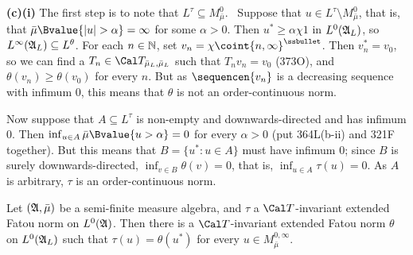 {\medskip

{\bf (c)(i)} The first step is to note that
$L^{\tau}\subseteq M^0_{\bar\mu}$.   \Prf\Quer\ Suppose that
$u\in L^{\tau}\setminus M^0_{\bar\mu}$, that is, that
$\bar\mu\Bvalue{|u|>\alpha}=\infty$ for
some $\alpha>0$.   Then $u^*\ge\alpha\chi 1$ in $L^0(\frak A_L)$, so
$L^{\infty}(\frak A_L)\subseteq L^{\theta}$.   For each $n\in\Bbb N$,
set $v_n=\chi\coint{n,\infty}^{\ssbullet}$.   Then $v_n^*=v_0$, so we
can find a $T_n\in\Cal T_{\bar\mu_L,\bar\mu_L}$ such that $T_nv_n=v_0$
(373O), and $\theta(v_n)\ge\theta(v_0)$ for every $n$.   But as
$\sequencen{v_n}$ is a decreasing sequence with infimum $0$, this means
that $\theta$ is not an order-continuous norm.\ \Bang\Qed

\medskip

 Now suppose that $A\subseteq L^{\tau}$ is non-empty and
downwards-directed and has infimum $0$.   Then
$\inf_{u\in A}\bar\mu\Bvalue{u>\alpha}=0$ for every $\alpha>0$ (put
364L(b-ii) and 321F
together).   But this means that $B=\{u^*:u\in A\}$ must have infimum
$0$;  since $B$ is surely downwards-directed,
$\inf_{v\in B}\theta(v)=0$, that is, $\inf_{u\in A}\tau(u)=0$.   As $A$
is arbitrary, $\tau$ is an order-continuous norm.
}%

 Let $(\frak A,\bar\mu)$ be a semi-finite measure
algebra, and $\tau$ a $\Cal T$-invariant extended Fatou norm on
$L^0(\frak A)$.   Then there is a $\Cal T$-invariant extended Fatou norm
$\theta$ on $L^0(\frak A_L)$ such that $\tau(u)=\theta(u^*)$
for every $u\in M^{0,\infty}_{\bar\mu}$.

